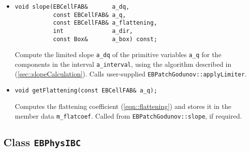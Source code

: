 \begin{itemize}

\item \begin{small}\begin{verbatim}
void slope(EBCellFAB&       a_dq,
           const EBCellFAB& a_q,
           const EBCellFAB& a_flattening,
           int              a_dir,
           const Box&       a_box) const;
\end{verbatim}\end{small}
Compute the limited slope \verb/a_dq/ of the primitive variables 
\verb/a_q/ for the components in the interval \verb/a_interval/,
 using the algorithm described in
(\ref{sec::slopeCalculation}). 
Calls user-supplied {\tt EBPatchGodunov::applyLimiter}.

\item \begin{small}\begin{verbatim}
void getFlattening(const EBCellFAB& a_q);
\end{verbatim}\end{small}
Computes the flattening coefficient (\ref{eqn::flattening})
and stores it in the member data
{\verb/m_flatcoef/}. Called from {\tt EBPatchGodunov::slope}, if required. 

\end{itemize}


\subsection{Class {\tt EBPhysIBC}}
\label{sec::ebphysibc}

